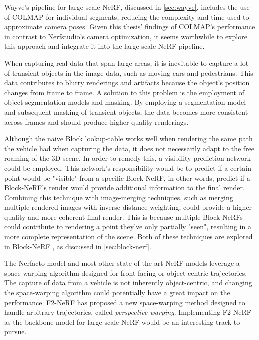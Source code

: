 Wayve's pipeline for large-scale NeRF, discussed in \autoref{sec:wayve}, includes the use of COLMAP for individual segments, reducing the complexity and time used to approximate camera poses. Given this thesis' findings of COLMAP's performance in contrast to Nerfstudio's camera optimization, it seems worthwhile to explore this approach and integrate it into the large-scale NeRF pipeline.

When capturing real data that span large areas, it is inevitable to capture a lot of transient objects in the image data, such as moving cars and pedestrians. This data contributes to blurry renderings and artifacts because the object's position changes from frame to frame. A solution to this problem is the employment of object segmentation models and masking. By employing a segmentation model and subsequent masking of transient objects, the data becomes more consistent across frames and should produce higher-quality renderings.

Although the naive Block lookup-table works well when rendering the same path the vehicle had when capturing the data, it does not necessarily adapt to the free roaming of the 3D scene. In order to remedy this, a visibility prediction network could be employed. This network's responsibility would be to predict if a certain point would be "visible" from a specific Block-NeRF, in other words, predict if a Block-NeRF's render would provide additional information to the final render. Combining this technique with image-merging techniques, such as merging multiple rendered images with inverse distance weighting, could provide a higher-quality and more coherent final render. This is because multiple Block-NeRFs could contribute to rendering a point they've only partially "seen", resulting in a more complete representation of the scene. Both of these techniques are explored in Block-NeRF \cite{tancik_block-nerf_2022}, as discussed in \autoref{sec:block-nerf}.

The Nerfacto-model and most other state-of-the-art NeRF models leverage a space-warping algorithm designed for front-facing or object-centric trajectories. The capture of data from a vehicle is not inherently object-centric, and changing the space-warping algorithm could potentially have a great impact on the performance. F2-NeRF \cite{wang_f2-nerf_2023} has proposed a new space-warping method designed to handle arbitrary trajectories, called \textit{perspective warping}. Implementing F2-NeRF as the backbone model for large-scale NeRF would be an interesting track to pursue.





